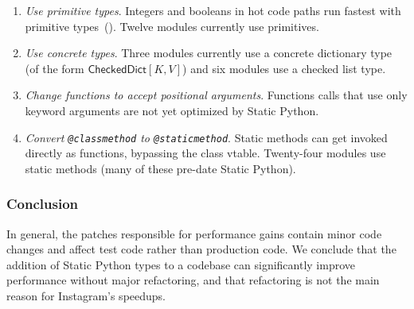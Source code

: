 \documentclass[english,cleveref,crc]{programming}
\newcommand{\SP}{Static Python}
\newcommand{\code}[1]{\texttt{#1}}
\newcommand{\ipara}[1]{\emph{#1}\/.}
\newcommand{\typefont}[1]{\mathsf{#1}}
\newcommand{\paramtype}[2]{#1[#2]}
\newcommand{\sptrawchkdict}{\typefont{CheckedDict}} %
\newcommand{\sptchkdict}[2]{\paramtype{\sptrawchkdict}{#1, #2}}
\begin{document}
\begin{enumerate}
  \item
    \ipara{Use primitive types}
    Integers and booleans in hot code paths run fastest with
    primitive types~().
    Twelve modules currently use primitives.

  \item
    \ipara{Use concrete types}
    Three modules currently use a concrete dictionary type
    (of the form $\sptchkdict{K}{V}$)
    and six modules use a checked list type.

  \item
    \ipara{Change functions to accept positional arguments}
    Functions calls that use only keyword arguments are not yet optimized by \SP{}.


  \item
    \ipara{Convert \code{@classmethod} to \code{@staticmethod}}
    Static methods can get invoked directly as functions, bypassing the class vtable.
    Twenty-four modules use static methods (many of these pre-date \SP{}).


\end{enumerate}

\subsubsection{Conclusion}

In general, the patches responsible for performance gains contain minor
code changes and 
affect test code rather than production code.
We conclude that the addition of \SP{} types to a codebase can significantly
improve performance without major refactoring, and that refactoring is not
the main reason for Instagram's speedups.
\end{document}
